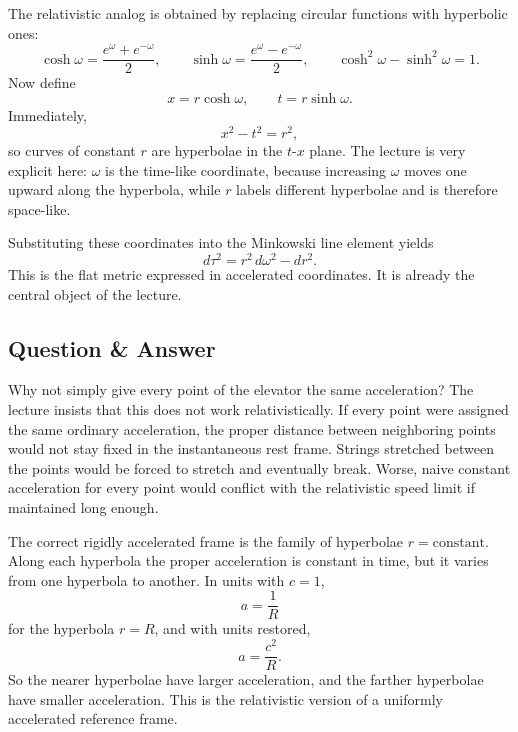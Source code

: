 The relativistic analog is obtained by replacing circular functions with hyperbolic ones:
\begin{equation}
\cosh\omega=\frac{e^\omega+e^{-\omega}}{2},
\qquad
\sinh\omega=\frac{e^\omega-e^{-\omega}}{2},
\qquad
\cosh^2\omega-\sinh^2\omega=1.
\end{equation}
Now define
\begin{equation}
x=r\cosh\omega,
\qquad
t=r\sinh\omega.
\end{equation}
Immediately,
\begin{equation}
x^2-t^2=r^2,
\end{equation}
so curves of constant \(r\) are hyperbolae in the \(t\)-\(x\) plane. The lecture is very explicit here: \(\omega\) is the time-like coordinate, because increasing \(\omega\) moves one upward along the hyperbola, while \(r\) labels different hyperbolae and is therefore space-like.

Substituting these coordinates into the Minkowski line element yields
\begin{equation}
d\tau^2=r^2\,d\omega^2-dr^2.
\end{equation}
This is the flat metric expressed in accelerated coordinates. It is already the central object of the lecture.

\subsection{Question \& Answer}

Why not simply give every point of the elevator the same acceleration? The lecture insists that this does not work relativistically. If every point were assigned the same ordinary acceleration, the proper distance between neighboring points would not stay fixed in the instantaneous rest frame. Strings stretched between the points would be forced to stretch and eventually break. Worse, naive constant acceleration for every point would conflict with the relativistic speed limit if maintained long enough.

The correct rigidly accelerated frame is the family of hyperbolae \(r=\text{constant}\). Along each hyperbola the proper acceleration is constant in time, but it varies from one hyperbola to another. In units with \(c=1\),
\begin{equation}
a=\frac{1}{R}
\end{equation}
for the hyperbola \(r=R\), and with units restored,
\begin{equation}
a=\frac{c^2}{R}.
\end{equation}
So the nearer hyperbolae have larger acceleration, and the farther hyperbolae have smaller acceleration. This is the relativistic version of a uniformly accelerated reference frame.

